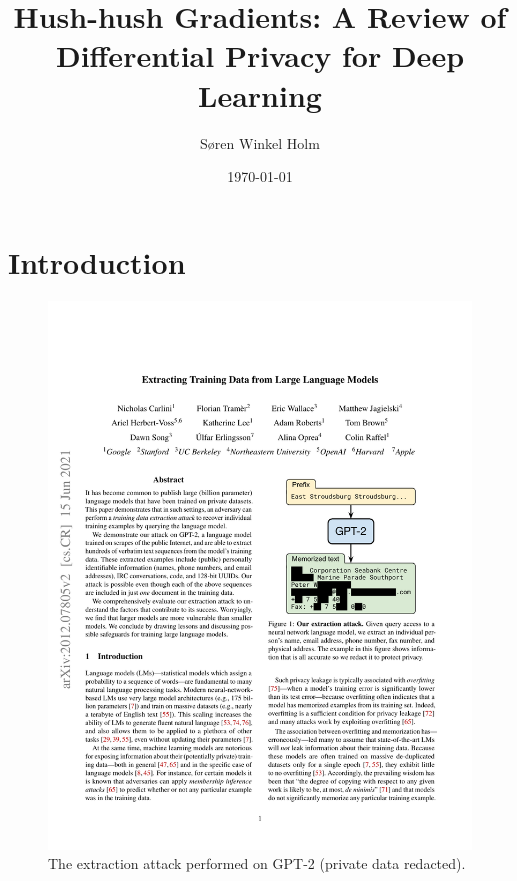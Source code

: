 \documentclass[12pt,fleqn,twocolumn]{article}
\title{Hush-hush Gradients: A Review of Differential Privacy for Deep Learning}
\author{Søren Winkel Holm}
\date{\today}
\begin{document}
\setlength{\headheight}{15pt}
\addtolength{\topmargin}{-2.5pt}

\maketitle
\thispagestyle{fancy}

\section*{Introduction}%
\label{sec:Introduction}

\begin{figure}[H]
    \centering
        \includegraphics[clip, trim=11.5cm 12cm 2.5cm 8cm, width=.8\linewidth]{extracting.pdf}
        \caption{The extraction attack performed on GPT-2 \cite[Fig. 1]{carlini2021extracting} (private data redacted).}
    \label{fig:extracting.pdf}
\end{figure}\noindent
\end{document}
